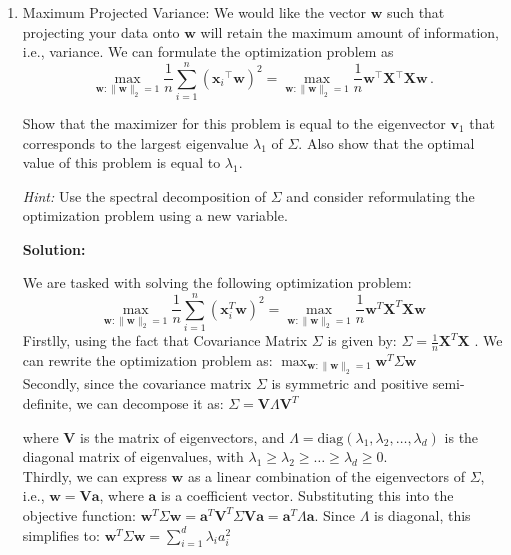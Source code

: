 \documentclass{article}
\newcommand{\mat}[1]{\mathbf{#1}}
\renewcommand{\vec}[1]{\boldsymbol{\mathbf{#1}}}
\newcommand{\tran}{{}^{\!\top\!}}
\newcommand{\T}{\tran}
\newenvironment{solution}{\color{blue} \smallskip \textbf{Solution:}}{}
\begin{document}
\begin{enumerate}
\item Maximum Projected Variance: We would like the vector $\vec{w}$ such that projecting your data onto $\vec{w}$ will retain the maximum amount of
information, i.e., variance. We can formulate the optimization problem as
  \begin{equation}
  \label{eq:main}
    \max_{\vec{w} : \|\vec{w}\|_2 = 1} \frac{1}{n} \sum_{i=1}^n \left(\vec{x}_i\T \vec{w}\right)^2 = \max_{\vec{w} : \|\vec{w}\|_2 = 1}\frac{1}{n} \vec{w}\T \mat{X}\T \mat{X}\vec{w}\,.
  \end{equation}

Show that the maximizer for this problem is equal to the eigenvector $\vec{v}_1$ that corresponds to the
largest eigenvalue $\lambda_1$ of $\Sigma$. Also show that the optimal value of this problem is
equal to $\lambda_1$.

\textit{Hint:} Use the spectral decomposition of $\Sigma$ and consider reformulating the optimization problem using a new variable. 

\begin{solution}
 
 
 We are tasked with solving the following optimization problem:
\[
\max_{\mathbf{w}: \|\mathbf{w}\|_2 = 1} \frac{1}{n} \sum_{i=1}^{n} \left(\mathbf{x}_i^T \mathbf{w}\right)^2 = \max_{\mathbf{w}: \|\mathbf{w}\|_2 = 1} \frac{1}{n} \mathbf{w}^T \mathbf{X}^T \mathbf{X} \mathbf{w}
\]
Firstlly, using the fact that Covariance Matrix \(\Sigma\) is given by:
\(\Sigma = \frac{1}{n} \mathbf{X}^T \mathbf{X}\) .
We can rewrite the optimization problem as:
\(\max_{\mathbf{w}: \|\mathbf{w}\|_2 = 1} \mathbf{w}^T \Sigma \mathbf{w}\) \\

Secondly, since the covariance matrix \(\Sigma\) is symmetric and positive semi-definite, we can decompose it as:
\(\Sigma = \mathbf{V} \Lambda \mathbf{V}^T\)

where \(\mathbf{V}\) is the matrix of eigenvectors, and \(\Lambda = \text{diag}(\lambda_1, \lambda_2, \dots, \lambda_d)\) is the diagonal matrix of eigenvalues, with \(\lambda_1 \geq \lambda_2 \geq \dots \geq \lambda_d \geq 0\).\\

Thirdly, we can express \(\mathbf{w}\) as a linear combination of the eigenvectors of \(\Sigma\), i.e., \(\mathbf{w} = \mathbf{V} \mathbf{a}\), where \(\mathbf{a}\) is a coefficient vector. Substituting this into the objective function:
\(\mathbf{w}^T \Sigma \mathbf{w} = \mathbf{a}^T \mathbf{V}^T \Sigma \mathbf{V} \mathbf{a} = \mathbf{a}^T \Lambda \mathbf{a}\).
Since \(\Lambda\) is diagonal, this simplifies to:
\(\mathbf{w}^T \Sigma \mathbf{w} = \sum_{i=1}^{d} \lambda_i a_i^2\)\\


\end{solution}
\end{enumerate}
\end{document}
